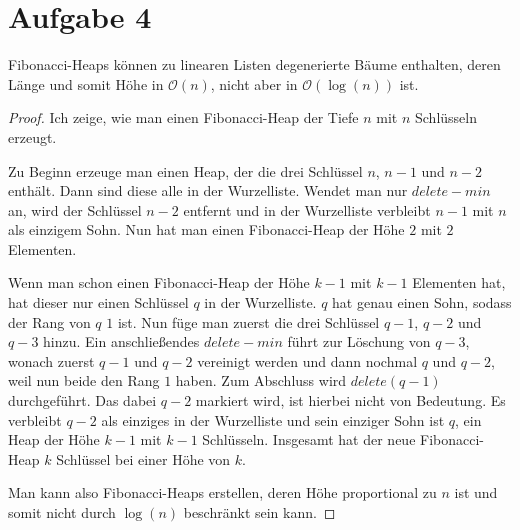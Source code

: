 \documentclass[10pt,a4paper]{article}
\begin{document}
\section{Aufgabe 4}

Fibonacci-Heaps können zu linearen Listen degenerierte Bäume enthalten, deren Länge und somit Höhe in $\mathscr{O}(n)$, nicht aber in $\mathscr{O}(\log(n))$ ist.

\begin{proof}
  Ich zeige, wie man einen Fibonacci-Heap der Tiefe $n$ mit $n$ Schlüsseln erzeugt.

  Zu Beginn erzeuge man einen Heap, der die drei Schlüssel $n$, $n - 1$ und $n - 2$ enthält.
  Dann sind diese alle in der Wurzelliste.
  Wendet man nur $delete-min$ an, wird der Schlüssel $n - 2$ entfernt und in der Wurzelliste verbleibt $n - 1$ mit $n$ als einzigem Sohn.
  Nun hat man einen Fibonacci-Heap der Höhe $2$ mit $2$ Elementen.

  Wenn man schon einen Fibonacci-Heap der Höhe $k - 1$ mit $k - 1$ Elementen hat, hat dieser nur einen Schlüssel $q$ in der Wurzelliste.
  $q$ hat genau einen Sohn, sodass der Rang von $q$ $1$ ist.
  Nun füge man zuerst die drei Schlüssel $q - 1$, $q - 2$ und $q - 3$ hinzu.
  Ein anschließendes $delete-min$ führt zur Löschung von $q - 3$, wonach zuerst $q - 1$ und $q - 2$ vereinigt werden und dann nochmal $q$ und $q - 2$, weil nun beide den Rang $1$ haben.
  Zum Abschluss wird $delete(q - 1)$ durchgeführt.
  Das dabei $q - 2$ markiert wird, ist hierbei nicht von Bedeutung.
  Es verbleibt $q - 2$ als einziges in der Wurzelliste und sein einziger Sohn ist $q$, ein Heap der Höhe $k - 1$ mit $k - 1$ Schlüsseln.
  Insgesamt hat der neue Fibonacci-Heap $k$ Schlüssel bei einer Höhe von $k$.

  Man kann also Fibonacci-Heaps erstellen, deren Höhe proportional zu $n$ ist und somit nicht durch $\log(n)$ beschränkt sein kann.
\end{proof}
\end{document}
